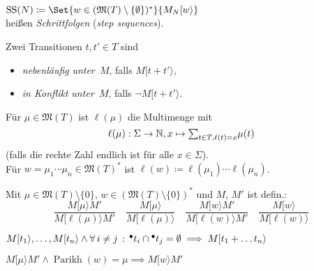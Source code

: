 \documentclass{cheat-sheet}
\newcommand{\preset}[1]{{}^\bullet{#1}} %
\newcommand{\activeTransition}[1]{[{#1}\rangle} %
\DeclareMathOperator{\Parikh}{Parikh} %
\newcommand{\inferrule}[2]{\frac{{#1}}{{#2}}} %
\newcommand{\Markings}{\mathfrak{M}} %
\newcommand{\Multisets}{\mathfrak{M}} %
\DeclareMathOperator{\StepSequences}{SS} %
\begin{document}
\begin{defn}
  \begin{minipage}[t]{0.8 \linewidth}
    $\StepSequences(N) \coloneqq \Set{w \in (\Markings(T) \setminus \{ \emptyset \})^{*}}{M_N \activeTransition{w}}$ \\
    heißen \emph{Schrittfolgen} (\textit{step sequences}).
  \end{minipage}
\end{defn}

\begin{defn}
  Zwei Transitionen $t, t' \in T$ sind
  \begin{itemize}
    \item \emph{nebenläufig} \textit{unter~$M$}, falls $M \activeTransition{t + t'}$,
    \item \emph{in Konflikt} \textit{unter~$M$}, falls $\neg M \activeTransition{t + t'}$.
  \end{itemize}
\end{defn}

\begin{nota}
  Für $\mu \in \Multisets(T)$ ist $\ell(\mu)$ die Multimenge mit
  \[
    \ell(\mu) : \Sigma \to \N, x \mapsto {\sum}_{t \in T, \ell(t) = x} \mu(t)
  \]
  (falls die rechte Zahl endlich ist für alle $x \in \Sigma$). \\
  Für $w = \mu_1 \cdots \mu_n \in \Multisets(T)^{*}$ ist 
  $\ell(w) \coloneqq \ell(\mu_1) \cdots \ell(\mu_n)$.
\end{nota}

\begin{defn}
  Mit $\mu \in \Markings(T) \setminus \{ 0 \}$, $w \in (\Markings(T) \setminus \{ 0 \})^{*}$ und $M$, $M'$ ist defin.:
  \[
    \inferrule
      {M \activeTransition{\mu} M'}
      {M \activeTransition{\ell(\mu)} M'} \quad
    \inferrule
      {M \activeTransition{\mu}}
      {M \activeTransition{\ell(\mu)}} \quad
    \inferrule
      {M \activeTransition{w} M'}
      {M \activeTransition{\ell(w)} M'} \quad
    \inferrule
      {M \activeTransition{w}}
      {M \activeTransition{\ell(w)}}
  \]
\end{defn}

\begin{lem}
  $M \activeTransition{t_1}, \ldots, M \activeTransition{t_n} \wedge \fa{i \neq j} \preset{t_i} \cap \preset{t_j} = \emptyset \implies M \activeTransition{t_1 + \ldots t_n}$
\end{lem}

\begin{lem}
  $M \activeTransition{\mu} M' \wedge \Parikh(w) = \mu \implies M \activeTransition{w} M'$
\end{lem}
\end{document}
